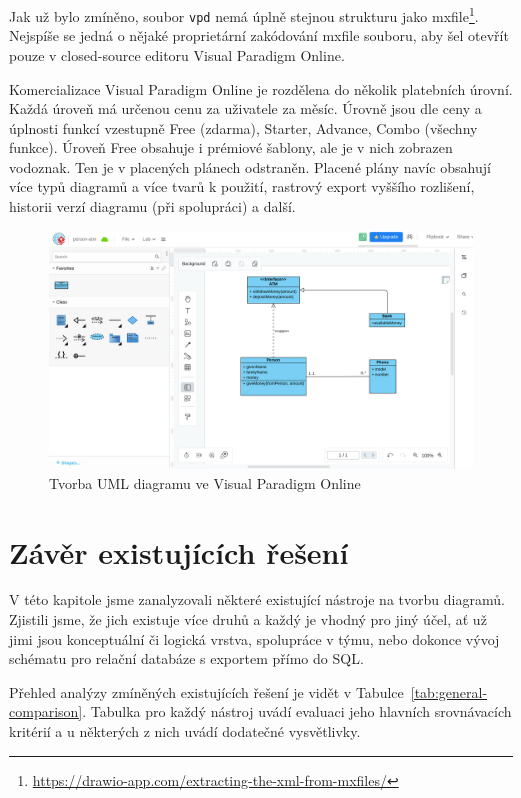 Jak už bylo zmíněno, soubor \texttt{vpd} nemá úplně stejnou strukturu jako mxfile\footnote{\url{https://drawio-app.com/extracting-the-xml-from-mxfiles/}}.
Nejspíše se jedná o nějaké proprietární zakódování mxfile souboru, aby šel otevřít pouze v closed-source editoru Visual Paradigm Online.

Komercializace Visual Paradigm Online je rozdělena do několik platebních úrovní.
Každá úroveň má určenou cenu za uživatele za měsíc.
Úrovně jsou dle ceny a úplnosti funkcí vzestupně Free (zdarma), Starter, Advance, Combo (všechny funkce).
Úroveň Free obsahuje i prémiové šablony, ale je v nich zobrazen vodoznak.
Ten je v placených plánech odstraněn.
Placené plány navíc obsahují více typů diagramů a více tvarů k použití, rastrový export vyššího rozlišení, historii verzí diagramu (při spolupráci) a další.

\begin{figure}[!htb]
  \centering
  \includegraphics[width = \maxwidth{\textwidth}]{../img/visual-paradigm-online.png}
  \caption{Tvorba UML diagramu ve Visual Paradigm Online}
  \label{fig:vpo}
\end{figure}
\section{Závěr existujících řešení}

V této kapitole jsme zanalyzovali některé existující nástroje na tvorbu diagramů.
Zjistili jsme, že jich existuje více druhů a každý je vhodný pro jiný účel, ať už jimi jsou konceptuální či logická vrstva, spolupráce v týmu, nebo dokonce vývoj schématu pro relační databáze s exportem přímo do SQL.

Přehled analýzy zmíněných existujících řešení je vidět v Tabulce~\ref{tab:general-comparison}.
Tabulka pro každý nástroj uvádí evaluaci jeho hlavních srovnávacích kritérií a u některých z nich uvádí dodatečné vysvětlivky.

